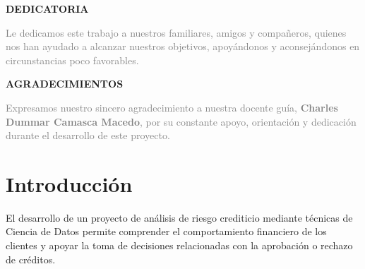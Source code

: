 \documentclass[12pt,a4paper]{article}
\begin{document}
\thispagestyle{empty}
\imprimircaratula
\clearpage


\begin{center}
    \vspace*{3cm}
    \normalsize \textbf{DEDICATORIA}
    \vspace{6cm}
\end{center}
\hspace{7.9cm}
\begin{minipage}{\dimexpr\textwidth-8cm}
    \textcolor{gray}{
        Le dedicamos este trabajo a nuestros familiares, amigos y compañeros,
        quienes nos han ayudado a alcanzar nuestros objetivos, apoyándonos y
        aconsejándonos en circunstancias poco favorables.
    }
\end{minipage}

\newpage

\begin{center}
    \vspace*{3cm}
    \normalsize \textbf{AGRADECIMIENTOS}
    \vspace{6cm}
\end{center}
\hspace{7.9cm}
\begin{minipage}{\dimexpr\textwidth-8cm}
    \textcolor{gray}{
        Expresamos nuestro sincero agradecimiento a nuestra docente guía, \textbf{Charles Dummar Camasca Macedo}, por su constante apoyo, orientación y dedicación durante el desarrollo de este proyecto.
    }
\end{minipage}

\newpage



\setcounter{page}{1}

\begin{singlespace}
    \tableofcontents \newpage
\end{singlespace}



\section*{\centering Introducción}

El desarrollo de un proyecto de análisis de riesgo crediticio mediante técnicas de Ciencia de Datos permite comprender el comportamiento financiero de los clientes y apoyar la toma de decisiones relacionadas con la aprobación o rechazo de créditos.
\end{document}
